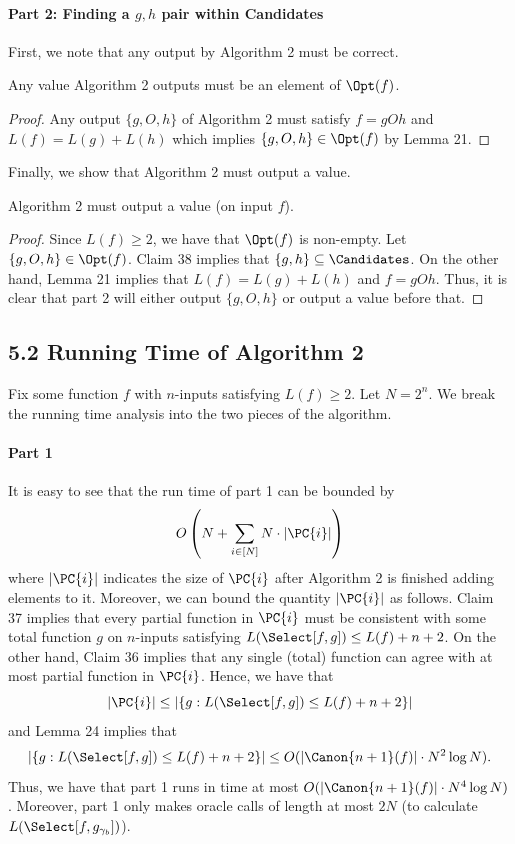 \paragraph{Part 2: Finding a $g,h$ pair within Candidates}
First, we note that any output by Algorithm 2 must be correct.
\begin{ntclaim}
Any value Algorithm 2 outputs must be an element of $\Opt(f)$.
\end{ntclaim}
\begin{proof}
Any output $\{g,O,h\}$ of Algorithm 2 must satisfy $f=gOh$ and $L(f)=L(g)+L(h)$ which implies $\{g,O,h\}\in\Opt(f)$ by Lemma 21.
\end{proof}
Finally, we show that Algorithm 2 must output a value.
\begin{ntclaim}
Algorithm 2 must output a value (on input $f$).
\end{ntclaim}
\begin{proof}
Since $L(f)\geq 2$, we have that $\Opt(f)$ is non-empty. Let $\{g,O,h\}\in\Opt(f)$.
Claim 38 implies that $\{g,h\}\subseteq\Candidates$. On the other hand, Lemma 21 implies that $L(f)=L(g)+L(h)$ and $f=gOh$. Thus, it is clear that part 2 will either output $\{g,O,h\}$ or output a value before that.
\end{proof}
\subsection*{5.2 Running Time of Algorithm 2}
Fix some function $f$ with $n$-inputs satisfying $L(f)\geq 2$. Let $N=2^n$. We break the running time analysis into the two pieces of the algorithm.
\paragraph{Part 1}
It is easy to see that the run time of part 1 can be bounded by
\[O\left(N+\sum_{i\in[N]}N\cdot|\PC{i}|\right)\]
where $|\PC{i}|$ indicates the size of $\PC{i}$ after Algorithm 2 is finished adding elements to it.
Moreover, we can bound the quantity $|\PC{i}|$ as follows. Claim 37 implies that every partial function in $\PC{i}$ must be consistent with some total function $g$ on $n$-inputs satisfying $L(\Select[f,g])\leq L(f)+n+2$.
On the other hand, Claim 36 implies that any single (total) function can agree with at most partial function in $\PC{i}$. Hence, we have that
\[|\PC{i}|\leq|\{g:L(\Select[f,g])\leq L(f)+n+2\}|\]
and Lemma 24 implies that
\[|\{g:L(\Select[f,g])\leq L(f)+n+2\}|\leq O(|\Canon{n+1}(f)|\cdot N^2\log N).\]
Thus, we have that part 1 runs in time at most $O(|\Canon{n+1}(f)|\cdot N^4\log N)$. Moreover, part 1 only makes oracle calls of length at most $2N$ (to calculate $L(\Select[f,g_{\gamma_b}])$).
